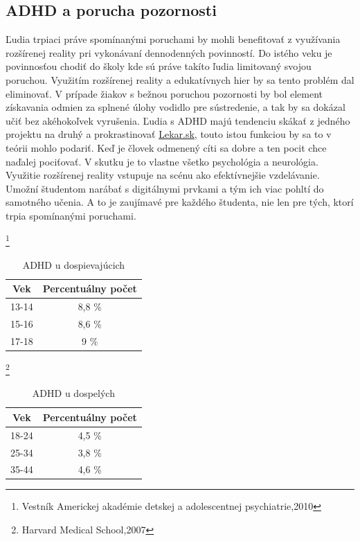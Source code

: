 \documentclass[10pt,twoside,a4paper]{article}
\begin{document}
\subsection{ADHD a porucha pozornosti}
Ľudia trpiaci práve spomínanými poruchami by mohli benefitovať z využívania rozšírenej reality pri vykonávaní dennodenných povinností. Do istého veku je povinnosťou chodiť do školy kde sú práve takíto ľudia limitovaný svojou poruchou. Využitím rozšírenej reality a edukatívnych hier by sa tento problém dal eliminovať. V prípade žiakov s bežnou poruchou pozornosti by bol element získavania odmien za splnené úlohy vodidlo pre sústredenie, a tak by sa dokázal učiť bez akéhokoľvek vyrušenia. Ľudia s ADHD majú tendenciu skákať z jedného projektu na druhý a prokrastinovať \href{https://lekar.sk/clanok/porucha-pozornosti-s-hyperaktivitou}{Lekar.sk}, touto istou funkciou by sa to v teórii mohlo podariť. Keď je človek odmenený cíti sa dobre a ten pocit chce naďalej pociťovať. V skutku je to vlastne všetko psychológia a neurológia. Využitie rozšírenej reality vstupuje na scénu ako efektívnejšie vzdelávanie. Umožní študentom narábať s digitálnymi prvkami a tým ich viac pohltí do samotného učenia. A to je zaujímavé pre každého študenta, nie len pre tých, ktorí trpia spomínanými poruchami. 
\begin{table}[h!]\thanks{Vestník Americkej akadémie detskej a adolescentnej psychiatrie,2010}
	\begin{center}
		\caption{ADHD u dospievajúcich}
		\label{tab:Tabuľka1}
		\begin{tabular}{|c|c|}
			\hline
			\textbf{Vek}&\textbf{Percentuálny počet}\\
			\hline
			13-14 & 8,8 \%\\
			\hline
			15-16 & 8,6 \%\\
			\hline
			17-18 & 9 \%\\
			\hline
		\end{tabular}
	\end{center}
\end{table}

\begin{table}[h!]\thanks{Harvard Medical School,2007}
	\begin{center}
		\caption{ADHD u dospelých}
		\label{tab:Tabuľka2}
		\begin{tabular}{|c|c|}
			\hline
			\textbf{Vek}&\textbf{Percentuálny počet}\\
			\hline
			18-24 & 4,5 \%\\
			\hline
			25-34 & 3,8 \%\\
			\hline
			35-44 & 4,6 \%\\
			\hline
		\end{tabular}
	\end{center}
\end{table}
\end{document}
